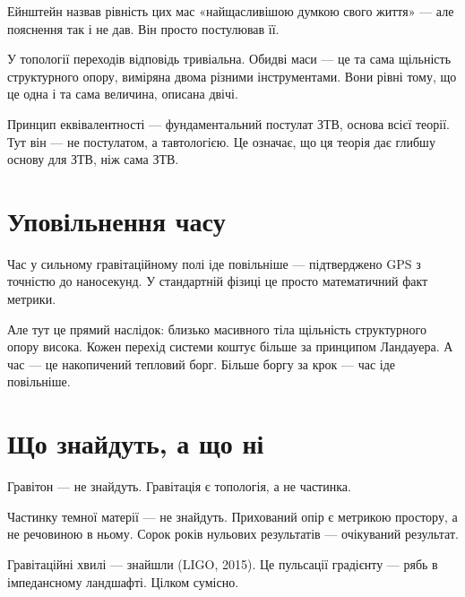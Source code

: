 \documentclass[12pt, a4paper, openany]{book}
\begin{document}
Ейнштейн назвав рівність цих мас «найщасливішою думкою свого життя» --- але пояснення так і не дав. Він просто постулював її.

У топології переходів відповідь тривіальна. Обидві маси --- це та сама щільність структурного опору, виміряна двома різними інструментами. Вони рівні тому, що це одна і та сама величина, описана двічі.

Принцип еквівалентності --- фундаментальний постулат ЗТВ, основа всієї теорії. Тут він — не постулатом, а тавтологією. Це означає, що ця теорія дає глибшу основу для ЗТВ, ніж сама ЗТВ.

\section{Уповільнення часу}

Час у сильному гравітаційному полі іде повільніше --- підтверджено GPS з точністю до наносекунд. У стандартній фізиці це просто математичний факт метрики.

Але тут це прямий наслідок: близько масивного тіла щільність структурного опору висока. Кожен перехід системи коштує більше за принципом Ландауера. А час --- це накопичений тепловий борг. Більше боргу за крок --- час іде повільніше.

\section{Що знайдуть, а що ні}

Гравітон --- не знайдуть. Гравітація є топологія, а не частинка.

Частинку темної матерії --- не знайдуть. Прихований опір є метрикою простору, а не речовиною в ньому. Сорок років нульових результатів --- очікуваний результат.

Гравітаційні хвилі --- знайшли (LIGO, 2015). Це пульсації градієнту --- рябь в імпедансному ландшафті. Цілком сумісно.
\end{document}
